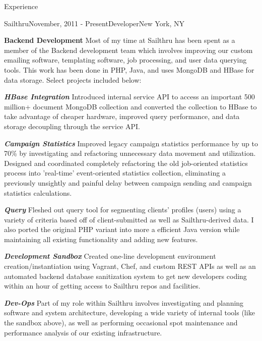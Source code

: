 \documentclass{resume} %
\begin{document}
\begin{rSection}{Experience}

\begin{rSubsection}{Sailthru}{November, 2011 - Present}{Developer}{New York, NY}
\item \textbf{Backend Development} Most of my time at Sailthru has been spent as a member of the Backend development team which involves improving our custom emailing software, templating software, job processing, and user data querying tools.  This work has been done in PHP, Java, and uses MongoDB and HBase for data storage.  Select projects included below:
\item \textbf{\textit{HBase Integration}} Introduced internal service API to access an important 500 million+ document MongoDB collection and converted the collection to HBase to take advantage of cheaper hardware, improved query performance, and data storage decoupling through the service API.
\item \textbf{\textit{Campaign Statistics}} Improved legacy campaign statistics performance by up to 70\% by investigating and refactoring unnecessary data movement and utilization. Designed and coordinated completely refactoring the old job-oriented statistics process into 'real-time' event-oriented statistics collection, eliminating a previously unsightly and painful delay between campaign sending and campaign statistics calculations.
\item \textbf{\textit{Query}} Fleshed out query tool for segmenting clients' profiles (users) using a variety of criteria based off of client-submitted as well as Sailthru-derived data. I also ported the original PHP variant into more a efficient Java version while maintaining all existing functionality and adding new features.
\item \textbf{\textit{Development Sandbox}} Created one-line development environment creation/instantiation using Vagrant, Chef, and custom REST APIs as well as an automated backend database sanitization system to get new developers coding within an hour of getting access to Sailthru repos and facilities.
\item \textbf{\textit{Dev-Ops}} Part of my role within Sailthru involves investigating and planning software and system architecture, developing a wide variety of internal tools (like the sandbox above), as well as performing occasional spot maintenance and performance analysis of our existing infrastructure.
\end{rSubsection}


\end{rSection}
\end{document}
